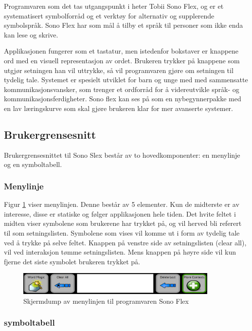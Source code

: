 \documentclass[phd,tocprelim]{cornell}
\begin{document}
Programvaren som det tas utgangspunkt i heter Tobii Sono Flex,  og er et systematisert symbolforråd og et verktøy for alternativ og supplerende symbolspråk. Sono Flex har som mål å tilby et språk til personer som ikke enda kan lese og skrive. 

Applikasjonen fungerer som et tastatur, men istedenfor bokstaver er knappene ord med en visuell representasjon av ordet. Brukeren trykker på knappene som utgjør setningen han vil uttrykke, så vil programvaren gjøre om setningen til tydelig tale.  Systemet er spesielt utviklet for barn og unge med med sammensatte kommunikasjonsvansker, som trenger et ordforråd for å videreutvikle språk- og kommunikasjonsferdigheter. Sono flex kan ses på som en nybegynnerpakke med en lav læringskurve som skal gjøre brukeren klar for mer avanserte systemer. 


\subsection{Brukergrensesnitt}

Brukergrensesnittet til Sono Slex består av to hovedkomponenter: en menylinje og en symboltabell. 


\subsubsection{Menylinje}

Figur \ref{fig:menylinje} viser menylinjen.  Denne består av 5 elementer.  Kun de midterste er av interesse, disse  er statiske og følger applikasjonen hele tiden. Det hvite feltet i midten viser symbolene som brukerene har trykket på, og vil herved bli referert til som setningslisten. Symbolene som vises vil komme ut i form av tydelig tale ved å trykke på selve feltet. Knappen på venstre side av setningslisten (clear all), vil ved interaksjon tømme setningslisten. Mens knappen på høyre side vil kun fjerne det siste symbolet brukeren trykket på.


\begin{figure}[ht!]
\centering
\includegraphics[width=100mm]{menylinje}
\caption{Skjermdump av menylinjen til programvaren Sono Flex}
\label{fig:menylinje}
\end{figure}




\subsubsection{symboltabell}
\label{subsubsec:symboltabell}
\end{document}
